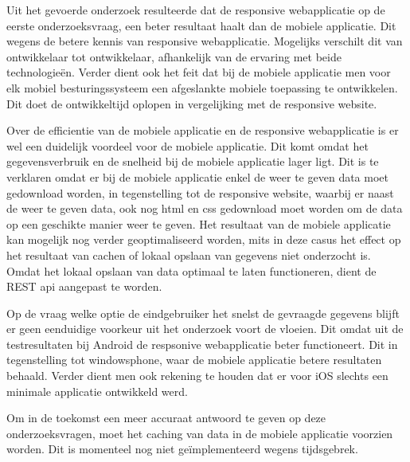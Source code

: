Uit het gevoerde onderzoek resulteerde dat de responsive
webapplicatie op de eerste onderzoeksvraag, een beter resultaat haalt dan de mobiele applicatie. Dit wegens de betere kennis van responsive webapplicatie. Mogelijks verschilt dit van ontwikkelaar tot ontwikkelaar,
afhankelijk van de ervaring met beide technologieën. Verder dient ook het feit dat bij de mobiele applicatie men voor elk mobiel besturingssysteem
een afgeslankte mobiele toepassing te ontwikkelen. Dit doet de ontwikkeltijd oplopen in vergelijking met de responsive website.

Over de efficientie van de mobiele applicatie en de responsive webapplicatie is er wel een duidelijk voordeel voor de mobiele applicatie.
Dit komt omdat het gegevensverbruik en de snelheid bij de mobiele applicatie lager ligt. Dit is te verklaren omdat er bij de mobiele applicatie
enkel de weer te geven data moet gedownload worden, in tegenstelling tot de responsive website, waarbij er naast de weer te geven data, ook nog html
en css gedownload moet worden om de data op een geschikte manier weer te geven. Het resultaat van de mobiele applicatie kan mogelijk nog verder geoptimaliseerd worden,
mits in deze casus het effect op het resultaat van cachen of lokaal opslaan van gegevens niet onderzocht is. Omdat het lokaal opslaan van data optimaal te laten functioneren,
dient de REST api aangepast te worden.

Op de vraag welke optie de eindgebruiker het snelst de gevraagde gegevens blijft er geen eenduidige voorkeur uit het onderzoek voort de vloeien.
Dit omdat uit de testresultaten bij Android de respsonive webapplicatie beter functioneert. Dit in tegenstelling tot windowsphone, waar de mobiele applicatie betere
resultaten behaald. Verder dient men ook rekening te houden dat er voor iOS slechts een minimale applicatie ontwikkeld werd.

Om in de toekomst een meer accuraat antwoord te geven op deze onderzoeksvragen, moet het caching van data in de mobiele applicatie voorzien worden.
Dit is momenteel nog niet geïmplementeerd wegens tijdsgebrek.
